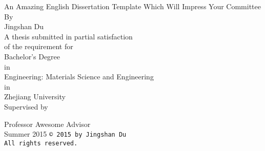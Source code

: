 \begin{titlepage}
	\begin{center}
		\large \doublespacing
		An Amazing English Dissertation Template Which Will Impress Your Committee \\[3em]	
		
		By\\		
		Jingshan Du \\[3em]
		
		A thesis submitted in partial satisfaction\\ of the requirement for\\		
		Bachelor's Degree\\		
		in\\		
		Engineering: Materials Science and Engineering\\		
		in\\		
		Zhejiang University \\[3em]
		
		Supervised by
		
		Professor Awesome Advisor\\[6em]
		
		Summer 2015
		\newpage
		\thispagestyle{empty}
		\null\vfill
		\texttt{\copyright~2015 by Jingshan Du\\All rights reserved.}
	\end{center}
	
\end{titlepage}